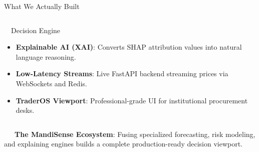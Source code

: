 \documentclass{beamer}
\begin{document}
\begin{frame}{What We Actually Built}
\begin{columns}[T]
    \begin{column}{0.32\textwidth}
        \begin{successcard}[height=5.2cm]{~~Decision Engine}
            \fontsize{6.2pt}{7.5pt}\selectfont
            \begin{itemize}\setlength\itemsep{4.5pt}\setlength\parskip{0pt}
                \item \textbf{Explainable AI (XAI)}: Converts SHAP attribution values into natural language reasoning.
                \item \textbf{Low-Latency Streams}: Live FastAPI backend streaming prices via WebSockets and Redis.
                \item \textbf{TraderOS Viewport}: Professional-grade UI for institutional procurement desks.
            \end{itemize}
        \end{successcard}
    \end{column}
\end{columns}

\vspace{0.15cm}
\begin{tcolorbox}[enhanced, colback=primaryblue!4, colframe=primaryblue!30, boxrule=0.35pt,
  arc=3.5pt, width=0.98\textwidth, left=4pt, right=4pt, top=2.5pt, bottom=2.5pt, boxsep=0pt,
  halign=center, shadow={0.5pt}{-0.5pt}{0pt}{black!8}]
    \fontsize{5.5pt}{6.5pt}\selectfont
    \textcolor{primaryDark}{~~~\textbf{The MandiSense Ecosystem}: Fusing specialized forecasting, risk modeling, and explaining engines builds a complete production-ready decision viewport.}
\end{tcolorbox}
\end{frame}
\end{document}
